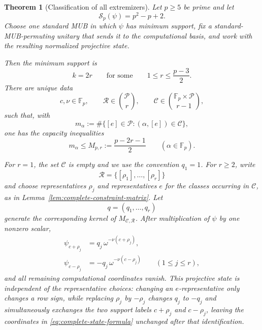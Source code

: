 \documentclass[11pt]{article}
\newtheorem{theorem}{Theorem}[section]
\newcommand{\F}{\mathbb F}
\begin{document}
\begin{theorem}[Classification of all extremizers]
\label{thm:complete-extremizer-classification}
Let \(p\ge5\) be prime and let
\[
 \mathcal S_p(\psi)=p^2-p+2.
\]
Choose one standard MUB in which \(\psi\) has minimum support, fix a
standard-MUB-permuting unitary that sends it to the computational basis,
and work with the resulting normalized projective state.

Then the minimum support is
\begin{equation}
 k=2r
 \qquad\text{for some}\qquad
 1\le r\le\frac{p-3}{2}.
 \label{eq:allowed-minimum-supports}
\end{equation}
There are unique data
\begin{equation}
 c,\nu\in\F_p,
 \qquad
 \mathcal R\in\binom{\mathcal P}{r},
 \qquad
 \mathcal C\in
 \binom{\F_p\times\mathcal P}{r-1},
 \label{eq:complete-extremizer-data}
\end{equation}
such that, with
\[
 m_\alpha
 :=
 \#\{[e]\in\mathcal P:(\alpha,[e])\in\mathcal C\},
\]
one has the capacity inequalities
\begin{equation}
 m_\alpha
 \le
 M_{p,r}:=
 \frac{p-2r-1}{2}
 \qquad(\alpha\in\F_p).
 \label{eq:complete-capacity}
\end{equation}

For \(r=1\), the set \(\mathcal C\) is empty and we use the convention
\(q_1=1\).  For \(r\ge2\), write
\[
 \mathcal R=\{[\rho_1],\ldots,[\rho_r]\}
\]
and choose representatives \(\rho_j\) and representatives \(e\) for the
classes occurring in \(\mathcal C\), as in
Lemma~\ref{lem:complete-constraint-matrix}.  Let
\[
 q=(q_1,\ldots,q_r)
\]
generate the corresponding kernel of
\(M_{\mathcal C,\mathcal R}\).  After multiplication of
\(\psi\) by one nonzero scalar,
\begin{equation}
 \boxed{
 \begin{aligned}
 \psi_{c+\rho_j}
 &=
 q_j\,\omega^{-\nu(c+\rho_j)},\\
 \psi_{c-\rho_j}
 &=
 -q_j\,\omega^{-\nu(c-\rho_j)}
 \qquad(1\le j\le r),
 \end{aligned}}
 \label{eq:complete-state-formula}
\end{equation}
and all remaining computational coordinates vanish.  This projective state
is independent of the representative choices: changing an \(e\)-representative
only changes a row sign, while replacing \(\rho_j\) by \(-\rho_j\) changes
\(q_j\) to \(-q_j\) and simultaneously exchanges the two support labels
\(c+\rho_j\) and \(c-\rho_j\), leaving the coordinates in
\eqref{eq:complete-state-formula} unchanged after that identification.


\end{theorem}
\end{document}
